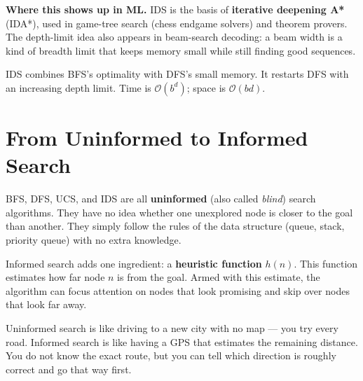 \documentclass[a4paper,11pt]{article}
\newcommand{\vocab}[1]{\textbf{\color{navy}#1}}
\begin{document}
\noindent\textbf{Where this shows up in ML.}
IDS is the basis of \textbf{iterative deepening A*} (IDA*), used in game-tree
search (chess endgame solvers) and theorem provers. The depth-limit idea also
appears in beam-search decoding: a beam width is a kind of breadth limit that
keeps memory small while still finding good sequences.

\begin{keytake}
IDS combines BFS's optimality with DFS's small memory. It restarts DFS with
an increasing depth limit. Time is $\mathcal{O}(b^{d})$; space is
$\mathcal{O}(bd)$.
\end{keytake}

\section{From Uninformed to Informed Search}

BFS, DFS, UCS, and IDS are all \vocab{uninformed} (also called \emph{blind})
search algorithms. They have no idea whether one unexplored node is closer to
the goal than another. They simply follow the rules of the data structure
(queue, stack, priority queue) with no extra knowledge.

Informed search adds one ingredient: a \vocab{heuristic function} $h(n)$.
This function estimates how far node $n$ is from the goal. Armed with this
estimate, the algorithm can focus attention on nodes that look promising and
skip over nodes that look far away.

\begin{intuition}
Uninformed search is like driving to a new city with no map --- you try every
road. Informed search is like having a GPS that estimates the remaining
distance. You do not know the exact route, but you can tell which direction is
roughly correct and go that way first.
\end{intuition}

\begin{center}\small
{}
\end{center}
\end{document}
